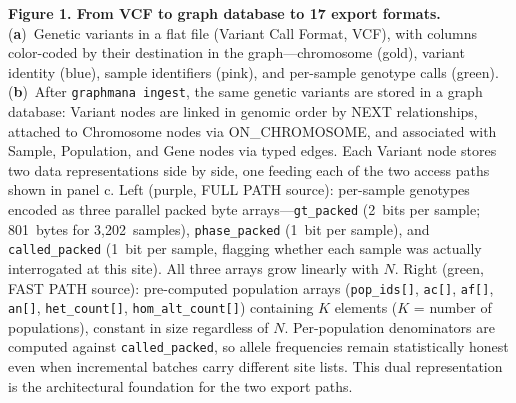 \documentclass[pdflatex,sn-nature]{sn-jnl}
\begin{document}
\noindent\textbf{Figure 1. From VCF to graph database to 17 export formats.}
(\textbf{a})~Genetic variants in a flat file (Variant Call Format, VCF), with columns color-coded by their destination in the graph---chromosome (gold), variant identity (blue), sample identifiers (pink), and per-sample genotype calls (green).
(\textbf{b})~After \texttt{graphmana ingest}, the same genetic variants are stored in a graph database: Variant nodes are linked in genomic order by NEXT relationships, attached to Chromosome nodes via ON\_CHROMOSOME, and associated with Sample, Population, and Gene nodes via typed edges. Each Variant node stores two data representations side by side, one feeding each of the two access paths shown in panel c. Left (purple, FULL PATH source): per-sample genotypes encoded as three parallel packed byte arrays---\texttt{gt\_packed} (2~bits per sample; 801~bytes for 3,202~samples), \texttt{phase\_packed} (1~bit per sample), and \texttt{called\_packed} (1~bit per sample, flagging whether each sample was actually interrogated at this site). All three arrays grow linearly with $N$. Right (green, FAST PATH source): pre-computed population arrays (\texttt{pop\_ids[]}, \texttt{ac[]}, \texttt{af[]}, \texttt{an[]}, \texttt{het\_count[]}, \texttt{hom\_alt\_count[]}) containing $K$ elements ($K$ = number of populations), constant in size regardless of $N$. Per-population denominators are computed against \texttt{called\_packed}, so allele frequencies remain statistically honest even when incremental batches carry different site lists. This dual representation is the architectural foundation for the two export paths.
\end{document}
